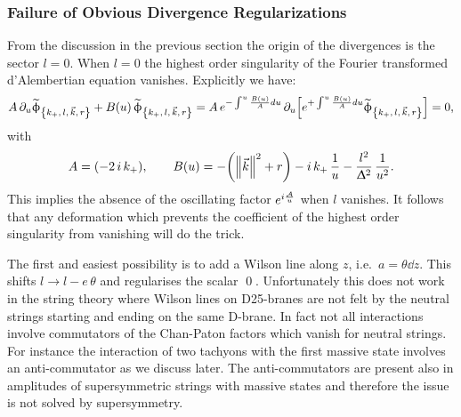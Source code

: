 \subsubsection{Failure of Obvious Divergence Regularizations}
\label{sec:saving}

From the discussion in the previous section the origin of the divergences is the sector $l = 0$.
When $l = 0$ the highest order singularity of the Fourier transformed d'Alembertian equation vanishes.
Explicitly we have:
\begin{equation}
  A\, \partial_{u} \widetilde{\upphi}_{\qty{k_+,\, l,\, \vec{k},\, r}}
  +
  B(u)\, \widetilde{\upphi}_{\qty{k_+,\, l,\, \vec{k},\, r}}
  =
  A\, e^{-\int^u \frac{B(u)}{A} du}\, 
  \partial_{u} \qty[ e^{+\int^u \frac{B(u)}{A} du} \widetilde{\upphi}_{\qty{k_+,\, l,\, \vec{k},\, r}} ]
  =
  0,
\end{equation}
with
\begin{equation}
  A = \qty(-2\, i\, k_+),
  \qquad
  B(u)
  =
  -\qty(\norm{\vec{k}}^2 + r)
  -
  i\, k_+\, \frac{1}{u}
  -
  \frac{l^2}{\Updelta^2}\, \frac{1}{u^2}.
\end{equation}
This implies the absence of the oscillating factor $e^{i \frac{\mathcal{A}}{u} }$ when $l$ vanishes.
It follows that any deformation which prevents the coefficient of the highest order singularity from vanishing will do the trick.

The first and easiest possibility is to add a Wilson line along $z$, i.e.\ $a = \theta \dd{z}$.
This shifts $l \rightarrow l - e\, \theta$ and regularises the scalar \qed.
Unfortunately this does not work in the string theory where Wilson lines on D25-branes are not felt by the neutral strings starting and ending on the same D-brane.
In fact not all interactions involve commutators of the Chan-Paton factors which vanish for neutral strings.
For instance the interaction of two tachyons with the first massive state involves an anti-commutator as we discuss later. 
The anti-commutators are present also in amplitudes of supersymmetric strings with massive states and therefore the issue is not solved by supersymmetry.

